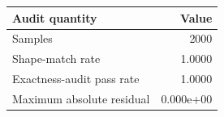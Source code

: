 \begin{tabular}{lr}
\hline
Audit quantity & Value \\
\hline
Samples & 2000 \\
Shape-match rate & 1.0000 \\
Exactness-audit pass rate & 1.0000 \\
Maximum absolute residual & 0.000e+00 \\
\hline
\end{tabular}

